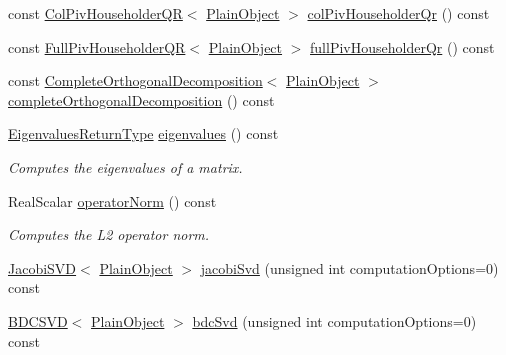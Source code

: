 \begin{DoxyCompactItemize}
\item 
const \mbox{\hyperlink{class_eigen_1_1_col_piv_householder_q_r}{Col\+Piv\+Householder\+QR}}$<$ \mbox{\hyperlink{class_eigen_1_1_dense_base_aae45af9b5aca5a9caae98fd201f47cc4}{Plain\+Object}} $>$ \mbox{\hyperlink{class_eigen_1_1_matrix_base_adee8c19c833245bbb00a591dce68e8a4}{col\+Piv\+Householder\+Qr}} () const
\item 
const \mbox{\hyperlink{class_eigen_1_1_full_piv_householder_q_r}{Full\+Piv\+Householder\+QR}}$<$ \mbox{\hyperlink{class_eigen_1_1_dense_base_aae45af9b5aca5a9caae98fd201f47cc4}{Plain\+Object}} $>$ \mbox{\hyperlink{class_eigen_1_1_matrix_base_a863bc0e06b641a089508eabec6835ab2}{full\+Piv\+Householder\+Qr}} () const
\item 
const \mbox{\hyperlink{class_eigen_1_1_complete_orthogonal_decomposition}{Complete\+Orthogonal\+Decomposition}}$<$ \mbox{\hyperlink{class_eigen_1_1_dense_base_aae45af9b5aca5a9caae98fd201f47cc4}{Plain\+Object}} $>$ \mbox{\hyperlink{class_eigen_1_1_matrix_base_ae90b6846f05bd30b8d52b66e427e3e09}{complete\+Orthogonal\+Decomposition}} () const
\item 
\mbox{\hyperlink{class_eigen_1_1_matrix}{Eigenvalues\+Return\+Type}} \mbox{\hyperlink{class_eigen_1_1_matrix_base_a30430fa3d5b4e74d312fd4f502ac984d}{eigenvalues}} () const
\begin{DoxyCompactList}\small\item\em Computes the eigenvalues of a matrix. \end{DoxyCompactList}\item 
Real\+Scalar \mbox{\hyperlink{class_eigen_1_1_matrix_base_a0ff9bc0b9bea2d0822a2bf3192783102}{operator\+Norm}} () const
\begin{DoxyCompactList}\small\item\em Computes the L2 operator norm. \end{DoxyCompactList}\item 
\mbox{\hyperlink{class_eigen_1_1_jacobi_s_v_d}{Jacobi\+S\+VD}}$<$ \mbox{\hyperlink{class_eigen_1_1_dense_base_aae45af9b5aca5a9caae98fd201f47cc4}{Plain\+Object}} $>$ \mbox{\hyperlink{class_eigen_1_1_matrix_base_a5745dca9c54390633b434e54a1d1eedd}{jacobi\+Svd}} (unsigned int computation\+Options=0) const
\item 
\mbox{\hyperlink{class_eigen_1_1_b_d_c_s_v_d}{B\+D\+C\+S\+VD}}$<$ \mbox{\hyperlink{class_eigen_1_1_dense_base_aae45af9b5aca5a9caae98fd201f47cc4}{Plain\+Object}} $>$ \mbox{\hyperlink{class_eigen_1_1_matrix_base_ae171b74b5d530846ee0836135ffcf837}{bdc\+Svd}} (unsigned int computation\+Options=0) const

\end{DoxyCompactItemize}
